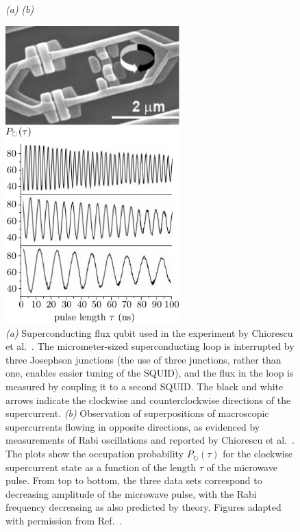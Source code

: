 \documentclass[3p,sort&compress,12pt]{elsarticle}
\begin{document}
\begin{figure}
{\footnotesize \hspace{1cm} \emph{(a)} \hspace{7.5cm} \emph{(b)} }

\centering
\begin{minipage}[c]{0.45\linewidth}
\centering
\vspace{0pt}
\includegraphics[width=0.6\textwidth]{chiosetup.pdf}
\end{minipage}
\hspace{0.5cm}
\begin{minipage}[c]{0.5\linewidth}
\vspace{0pt}
\centering
\includegraphics[width=0.6\textwidth]{chiorescu1.pdf}
\end{minipage}
\caption{\emph{(a)} Superconducting flux qubit used in the experiment by
  Chiorescu et al.\ \cite{Chiorescu:2003:ta}. The micrometer-sized superconducting loop is interrupted by three Josephson junctions (the use of three junctions, rather than one, enables easier tuning of the SQUID), and the flux in the loop is measured by coupling it to a second SQUID. The black and white arrows indicate the clockwise and counterclockwise directions of the supercurrent. \emph{(b)} Observation of superpositions of macroscopic supercurrents flowing in  opposite directions, as evidenced by measurements of Rabi oscillations and reported by Chiorescu et al.\ \cite{Chiorescu:2003:ta}. The plots show the occupation probability $P_\circlearrowright(\tau)$ for the clockwise supercurrent state as a function of the length $\tau$ of the microwave pulse. From top to bottom, the three data sets correspond to decreasing amplitude of the microwave pulse, with the Rabi frequency decreasing as also predicted by theory.  Figures adapted with permission from Ref.~\cite{Chiorescu:2003:ta}.}
\label{fig:chio}
\end{figure}
\end{document}
